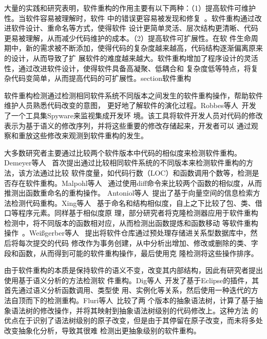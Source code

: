 大量的实践和研究表明，软件重构的作用主要有以下两种：（1）提高软件可维护性。当软件容易被理解时，软件
中的错误更容易被发现和修复~\cite{martin2009clean}。软件重构通过改进软件设计、重命名等方式，使得软件
设计更简单灵活、层次结构更清晰、代码更易被理解，从而减少代码维护的成本。（2）提高软件可扩展性。在软
件生命周期中，新的需求被不断添加，使得代码的复杂度越来越高，代码结构逐渐偏离原来的设计，从而导致了扩
展软件的难度越来越大。软件重构增加了程序设计的灵活性，通过改进软件设计，使得软件具备高凝聚、低耦合和
复杂度低等特点，将复杂代码变简单，从而提高代码的可扩展性。section{软件重构}

软件重构检测通过检测相同软件系统不同版本之间发生的软件重构操作，帮助软件维护人员熟悉代码改变的意图，
更好地了解软件的演化过程。Robbes等人~\cite{robbes2008spyware}开发了一个工具集Spyware来监视集成开发环
境。该工具将软件开发人员对代码的修改表示为基于语义的修改序列，并将这些重要的修改存储起来，开发者可以
通过观察和重放这些修改来观测到软件重构的发生。

大多数研究者主要通过比较两个软件版本中代码的相似度来检测软件重构。Demeyer等人
~\cite{demeyer2000finding}首次提出通过比较相同软件系统的不同版本来检测软件重构的方法，该方法通过比较
软件度量，如代码行数（LOC）和函数调用个数等，检测是否存在软件重构。Malpohl等人
~\cite{malpohl2003renaming}通过使用diff命令来比较两个函数的相似度，从而推测出函数重命名的重构操作。
Antoniol等人~\cite{antoniol2004automatic}提出了基于向量空间的信息检索方法检测代码重构。Xing等人
~\cite{xing2005umldiff}基于命名和结构相似度，自上之下比较了包、类、借口等程序元素。同样基于相似度原
理，部分研究者将克隆检测器应用于软件重构检测中，将不同版本的函数相对应，从而检测出函数提炼和函数移动
等软件重构操作~\cite{van2003reconstruction,kim2005functions}。Weißgerber等人
~\cite{weissgerber2006identifying}提出将软件仓库通过预处理存储进关系型数据库中，然后将每次提交的代码
修改作为事务创建，从中分析出增加、修改或删除的类、字段和函数，从而得到可能的软件重构操作，最后使用克
隆检测将这些操作排序。

由于软件重构的本质是保持软件的语义不变，改变其内部结构，因此有研究者提出使用基于语义分析的方法检测软
件重构。Dig等人~\cite{dig2006automated}开发了基于Eclipse的插件，其首先通过语义分析函数调用、类型使
用、实例化等关系，然后使用一种迭代的方法自顶而下的检测重构。Fluri等人~\cite{fluri2007change}比较了两
个版本的抽象语法树，计算了基于抽象语法树的修改操作，并将其映射到抽象语法树级别的代码修改上。这种方法
的优点在于识别了语法树级别的原子改变，但是由于其停留在原子改变，而未将多处改变抽象化分析，导致其很难
检测出更抽象级别的软件重构。

